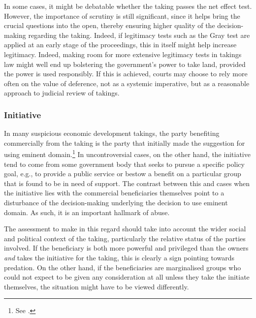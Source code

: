 In some cases, it might be debatable whether the taking passes the net effect test. However, the importance of scrutiny is still significant, since it helps bring the crucial questions into the open, thereby ensuring higher quality of the decision-making regarding the taking. Indeed, if legitimacy tests such as the Gray test are applied at an early stage of the proceedings, this in itself might help increase legitimacy. Indeed, making room for more extensive legitimacy tests in takings law might well end up bolstering the government's power to take land, provided the power is used responsibly. If this is achieved, courts may choose to rely more often on the value of deference, not as a systemic imperative, but as a reasonable approach to judicial review of takings.

\subsubsection*{Initiative}

In many suspicious economic development takings, the party benefiting commercially from the taking is the party that initially made the suggestion for using eminent domain.\footnote{See \cite[32]{gray11}.} In uncontroversial cases, on the other hand, the initiative tend to come from some government body that seeks to pursue a specific policy goal, e.g., to provide a public service or bestow a benefit on a particular group that is found to be in need of support. The contrast between this and cases when the initiative lies with the commercial beneficiaries themselves point to a disturbance of the decision-making underlying the decision to use eminent domain. As such, it is an important hallmark of abuse.

The assessment to make in this regard should take into account the wider social and political context of the taking, particularly the relative status of the parties involved. If the beneficiary is both more powerful and privileged than the owners {\it and} takes the initiative for the taking, this is clearly a sign pointing towards predation. On the other hand, if the beneficiaries are marginalised groups who could not expect to be given any consideration at all unless they take the initiate themselves, the situation might have to be viewed differently. %

